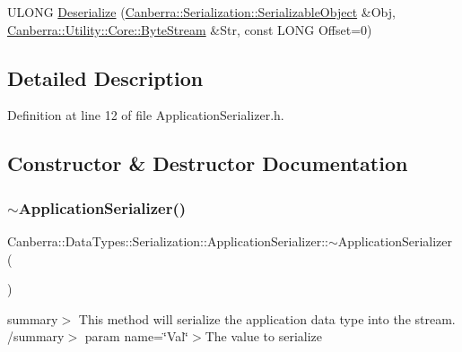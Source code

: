\begin{DoxyCompactItemize}
\item 
U\+L\+O\+NG \hyperlink{class_canberra_1_1_data_types_1_1_serialization_1_1_application_serializer_a5894cef5d85a2a5c6a766ce68e05640e_a5894cef5d85a2a5c6a766ce68e05640e}{Deserialize} (\hyperlink{class_canberra_1_1_serialization_1_1_serializable_object}{Canberra\+::\+Serialization\+::\+Serializable\+Object} \&Obj, \hyperlink{class_canberra_1_1_utility_1_1_core_1_1_byte_stream}{Canberra\+::\+Utility\+::\+Core\+::\+Byte\+Stream} \&Str, const L\+O\+NG Offset=0)
\end{DoxyCompactItemize}


\subsection{Detailed Description}


Definition at line 12 of file Application\+Serializer.\+h.



\subsection{Constructor \& Destructor Documentation}
\mbox{\label{class_canberra_1_1_data_types_1_1_serialization_1_1_application_serializer_a6246aca8efdac2cbc550645380806a23_a6246aca8efdac2cbc550645380806a23}} 
\subsubsection{\texorpdfstring{$\sim$\+Application\+Serializer()}{~ApplicationSerializer()}}
{\footnotesize\ttfamily Canberra\+::\+Data\+Types\+::\+Serialization\+::\+Application\+Serializer\+::$\sim$\+Application\+Serializer (\begin{DoxyParamCaption}{ }\end{DoxyParamCaption})\hspace{0.3cm}{\ttfamily [virtual]}}

summary$>$ This method will serialize the application data type into the stream. /summary$>$ param name=\char`\"{}\+Val\char`\"{}$>$The value to serialize

